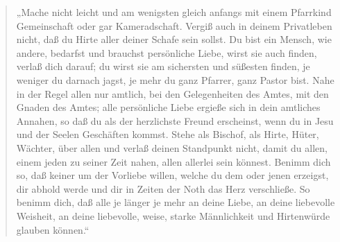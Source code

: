\begin{quote}
„Mache nicht leicht und am wenigsten gleich anfangs mit einem Pfarrkind Gemeinschaft oder gar Kameradschaft. Vergiß auch in deinem Privatleben nicht, daß du Hirte aller deiner Schafe sein sollst. Du bist ein Mensch, wie andere, bedarfst und brauchst persönliche Liebe, wirst sie auch finden, verlaß dich darauf; du wirst sie am sichersten und süßesten finden, je weniger du darnach jagst, je mehr du ganz Pfarrer, ganz Pastor bist. Nahe in der Regel allen nur amtlich, bei den Gelegenheiten des Amtes, mit den Gnaden des Amtes; alle persönliche Liebe ergieße sich in dein amtliches Annahen, so daß du als der herzlichste Freund erscheinst, wenn du in Jesu und der Seelen Geschäften kommst. Stehe als Bischof, als Hirte, Hüter, Wächter, über allen und verlaß deinen Standpunkt nicht, damit du allen, einem jeden zu seiner Zeit nahen, allen allerlei sein könnest. Benimm dich so, daß keiner um der Vorliebe willen, welche du dem
oder jenen erzeigst, dir abhold werde und dir in Zeiten der Noth das Herz verschließe. So benimm dich, daß alle je länger je mehr an deine Liebe, an deine liebevolle Weisheit, an deine liebevolle, weise, starke Männlichkeit und Hirtenwürde glauben können.“
\end{quote}

